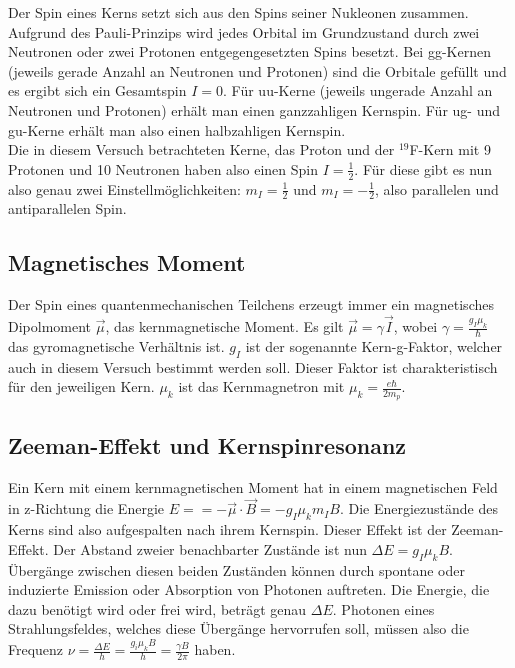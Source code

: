 \documentclass[12pt]{article}
\begin{document}
Der Spin eines Kerns setzt sich aus den Spins seiner Nukleonen zusammen. Aufgrund des Pauli-Prinzips wird jedes Orbital im Grundzustand durch zwei Neutronen oder zwei Protonen entgegengesetzten Spins besetzt. Bei gg-Kernen (jeweils gerade Anzahl an Neutronen und Protonen) sind die Orbitale gefüllt und es ergibt sich ein Gesamtspin $I=0$. Für uu-Kerne (jeweils ungerade Anzahl an Neutronen und Protonen) erhält man einen ganzzahligen Kernspin. Für ug- und gu-Kerne erhält man also einen halbzahligen Kernspin.\\

Die in diesem Versuch betrachteten Kerne, das Proton und der $^{19}$F-Kern mit 9 Protonen und 10 Neutronen haben also einen Spin $I=\frac12$. Für diese gibt es nun also genau zwei Einstellmöglichkeiten: $m_I=\frac12$ und $m_I=-\frac12$, also parallelen und antiparallelen Spin.

\subsection{Magnetisches Moment}
Der Spin eines quantenmechanischen Teilchens erzeugt immer ein magnetisches Dipolmoment $\vec\mu$, das kernmagnetische Moment. Es gilt $\vec\mu=\gamma\vec I$, wobei $\gamma=\frac{g_I\mu_k}{\hbar}$ das gyromagnetische Verhältnis ist. $g_I$ ist der sogenannte Kern-g-Faktor, welcher auch in diesem Versuch bestimmt werden soll. Dieser Faktor ist charakteristisch für den jeweiligen Kern. $\mu_k$ ist das Kernmagnetron mit $\mu_k=\frac{e\hbar}{2m_p}$.

\subsection{Zeeman-Effekt und Kernspinresonanz}
Ein Kern mit einem kernmagnetischen Moment hat in einem magnetischen Feld in z-Richtung die Energie $E==-\vec\mu\cdot\vec B=-g_I\mu_km_IB$. Die Energiezustände des Kerns sind also aufgespalten nach ihrem Kernspin. Dieser Effekt ist der Zeeman-Effekt. Der Abstand zweier benachbarter Zustände ist nun $\Delta E=g_I\mu_k B$.\\

Übergänge zwischen diesen beiden Zuständen können durch spontane oder induzierte Emission oder Absorption von Photonen auftreten. Die Energie, die dazu benötigt wird oder frei wird, beträgt genau $\Delta E$. Photonen eines Strahlungsfeldes, welches diese Übergänge hervorrufen soll, müssen also die Frequenz $\nu=\frac{\Delta E}{h}=\frac{g_i\mu_kB}{h}=\frac{\gamma B}{2\pi}$ haben.\\
\end{document}
